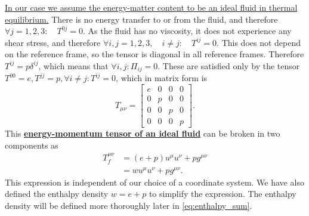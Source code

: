 \href{https://physics.stackexchange.com/a/412067/298623}{In our case we assume the energy-matter content to be an ideal fluid in thermal equilibrium.}
There is no energy transfer to or from the fluid, and therefore
$\forall j=1,2,3: \quad T^{0j} = 0$.
As the fluid has no viscosity, it does not experience any shear stress, and therefore
$\forall i,j=1,2,3, \quad i \neq j: \quad T^{ij} = 0$.
This does not depend on the reference frame, so the tensor is diagonal in all reference frames.
Therefore $T^{ij} = p \delta^{ij}$, which means that
$\forall i,j: \Pi_{ij} = 0$.
These are satisfied only by the tensor $T^{00}=e, T^{jj}=p, \forall i \neq j: T^{ij}=0$, which in matrix form is
\begin{equation}
T_{\mu \nu} =
\begin{bmatrix}
e & 0 & 0 & 0 \\
0 & p & 0 & 0 \\
0 & 0 & p & 0 \\
0 & 0 & 0 & p
\end{bmatrix}.
\end{equation}
This
\href{https://en.wikipedia.org/wiki/Stress\%E2\%80\%93energy\_tensor\#Stress\%E2\%80\%93energy\_of\_a\_fluid\_in\_equilibrium}{\textbf{energy-momentum tensor of an ideal fluid}}
can be broken in two components as
\cites[eq. 5.11, 5.23]{lecture_notes}[eq. 4.12]{rasanen_gr_2022}
\begin{align}
T^{\mu \nu}_f
&= (e+p) u^\mu u^\nu + p g^{\mu \nu}
\label{eq:ep_tensor} \\
&= w u^\mu u^\nu + p g^{\mu \nu}.
\end{align}
This expression is independent of our choice of a coordinate system.
We have also defined the enthalpy density $w = e+p$ to simplify the expression.
The enthalpy density will be defined more thoroughly later in \eqref{eq:enthalpy_sum}.

